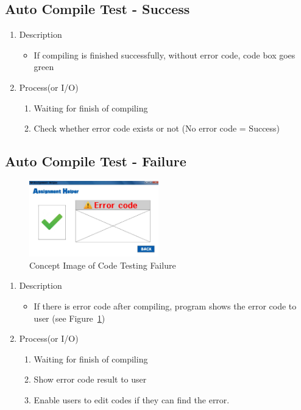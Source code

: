 \documentclass[conference]{IEEEtran}
\begin{document}
\textit{}

\subsection{Auto Compile Test - Success}

\begin{enumerate}
  \item Description
  \begin{itemize}
    \item If compiling is finished successfully, without error code, code box goes green
  \end{itemize}
  \item Process(or I/O)
  \begin{enumerate}
    \item Waiting for finish of compiling
    \item Check whether error code exists or not (No error code = Success)
  \end{enumerate}
\end{enumerate}

\textit{}

\subsection{Auto Compile Test - Failure}

\textit{}
\begin{figure}[h]
\centering
\includegraphics[width=0.5\textwidth]{./figures/UI_code_validation_fail.jpg}
\caption{Concept Image of Code Testing Failure}
\label{fig_concept_fail}
\end{figure}


\begin{enumerate}
  \item Description
  \begin{itemize}
    \item If there is error code after compiling, program shows the error code to user (see Figure~\ref{fig_concept_fail})
  \end{itemize}
  \item Process(or I/O)
  \begin{enumerate}
    \item Waiting for finish of compiling
    \item Show error code result to user
    \item Enable users to edit codes if they can find the error.
  \end{enumerate}
\end{enumerate}
\end{document}
